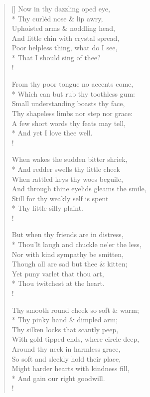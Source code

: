 \documentclass[MAIN]{subfiles}
\begin{document}
\begin{verse}[\versewidth]
Now in thy dazzling  oped eye,\\*
Thy curl\`ed nose \& lip awry,\\
Uphoisted arms \& noddling head,\\
And little chin with crystal spread,\\
Poor helpless thing, what do I see,\\*
\vin That I should sing of thee?\\!

From thy poor tongue no accents come,\\*
Which can but rub thy toothless gum:\\
Small understanding boasts thy face,\\
Thy shapeless limbs nor step nor grace:\\
A few short words thy feats may tell,\\*
\vin And yet I love thee well.\\!

When wakes the sudden bitter shriek,\\*
And redder swells thy little cheek\\
When rattled keys thy woes beguile,\\
And through thine eyelids gleams the smile,\\
Still for thy weakly self is spent\\*
\vin Thy little silly plaint.\\!

But when thy friends are in distress,\\*
Thou’lt laugh and chuckle ne'er the less,\\
Nor with kind sympathy be smitten,\\
Though all are sad but thee \& kitten;\\
Yet puny varlet that thou art,\\*
\vin Thou twitchest at the heart.\\!

Thy smooth round cheek so soft \& warm;\\*
Thy pinky hand \& dimpled arm;\\
Thy silken locks that scantly peep,\\
With gold tipped ends, where circle deep,\\
Around thy neck in harmless grace,\\
So soft and sleekly hold their place,\\
Might harder hearts with kindness fill,\\*
\vin And gain our right goodwill.\\!


\end{verse}
\end{document}
